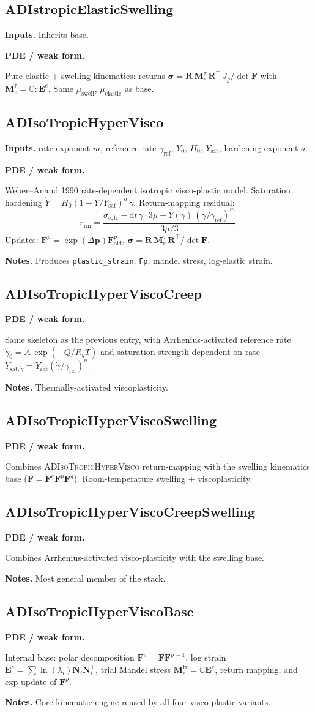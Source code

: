\documentclass[11pt]{article}
\newcommand{\Rg}{R_{\!g}}           %
\newenvironment{ecmEntry}[1]{%
  \subsection{#1}%
}{}
\newcommand{\inputsRow}[1]{\par\noindent\textbf{Inputs.} #1\par}
\newcommand{\pdeRow}[1]{\par\noindent\textbf{PDE / weak form.}\par #1\par}
\newcommand{\notesRow}[1]{\par\noindent\textbf{Notes.} #1\par}
\begin{document}
\begin{ecmEntry}{ADIstropicElasticSwelling}
\inputsRow{Inherits base.}
\pdeRow{Pure elastic + swelling kinematics: returns
$\bm{\sigma} = \bm{R}\,\bm{M}_e^{\tau}\,\bm{R}^{\!\top}\,J_g/\det\bm{F}$ with
$\bm{M}_e^\tau = \mathbb{C}:\bm{E}^e$. Same $\mu_{\text{swell}}$, $\mu_{\text{elastic}}$
as base.}
\end{ecmEntry}

\begin{ecmEntry}{ADIsoTropicHyperVisco}
\inputsRow{rate exponent $m$, reference rate $\dot\gamma_{\text{ref}}$,
$Y_0,\,H_0,\,Y_{\text{sat}}$, hardening exponent $a$.}
\pdeRow{Weber--Anand 1990 rate-dependent isotropic visco-plastic model. Saturation
hardening $\dot Y = H_0(1-Y/Y_{\text{sat}})^a\,\dot\gamma$. Return-mapping residual:
\[
  r_{\text{rm}} = \frac{\sigma_{e,\text{tr}} - \mathrm{d}t\,\dot\gamma\cdot 3\mu - Y(\dot\gamma)
    \,(\dot\gamma/\dot\gamma_{\text{ref}})^m}{3\mu/3}.
\]
Updates: $\bm{F}^p = \exp(\Delta\bm{p})\bm{F}^p_{\text{old}}$,
$\bm{\sigma} = \bm{R}\,\bm{M}_e^\tau\,\bm{R}^{\!\top}/\det\bm{F}$.}
\notesRow{Produces \texttt{plastic\_strain}, \texttt{Fp}, mandel stress, log-elastic strain.}
\end{ecmEntry}

\begin{ecmEntry}{ADIsoTropicHyperViscoCreep}
\pdeRow{Same skeleton as the previous entry, with Arrhenius-activated reference rate
$\dot\gamma_0 = A\,\exp(-Q/\Rg T)$ and saturation strength dependent on rate
$Y_{\text{sat},\dot\gamma} = Y_{\text{sat}}(\dot\gamma/\dot\gamma_{\text{ref}})^n$.}
\notesRow{Thermally-activated viscoplasticity.}
\end{ecmEntry}

\begin{ecmEntry}{ADIsoTropicHyperViscoSwelling}
\pdeRow{Combines \textsc{ADIsoTropicHyperVisco} return-mapping with the swelling
kinematics base ($\bm{F}=\bm{F}^e\bm{F}^p\bm{F}^g$). Room-temperature swelling +
viscoplasticity.}
\end{ecmEntry}

\begin{ecmEntry}{ADIsoTropicHyperViscoCreepSwelling}
\pdeRow{Combines Arrhenius-activated visco-plasticity with the swelling base.}
\notesRow{Most general member of the stack.}
\end{ecmEntry}

\begin{ecmEntry}{ADIsoTropicHyperViscoBase}
\pdeRow{Internal base: polar decomposition $\bm{F}^e = \bm{F}\bm{F}^{p\,-1}$, log strain
$\bm{E}^e=\sum\ln(\lambda_i)\bm{N}_i\bm{N}_i^{\!\top}$, trial Mandel stress
$\bm{M}_e^{\text{tr}} = \mathbb{C}\bm{E}^e$, return mapping, and exp-update of $\bm{F}^p$.}
\notesRow{Core kinematic engine reused by all four visco-plastic variants.}
\end{ecmEntry}
\end{document}
